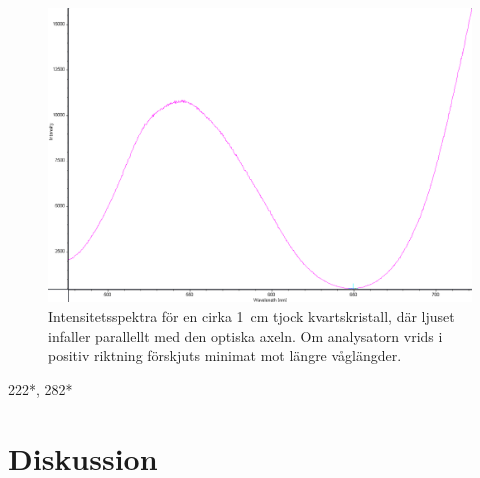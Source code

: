 \documentclass[a4paper]{article}
\begin{document}
\FloatBarrier
\begin{figure}[ht!]
	\centering
	\includegraphics[width=\linewidth]{data/spektra_aktiv2_inv}
	\caption{Intensitetsspektra för en cirka \SI{1}{\centi\m} tjock kvartskristall, där ljuset infaller parallellt med den optiska axeln. Om analysatorn vrids i positiv riktning förskjuts minimat mot längre våglängder.}
	\label{fig:}
\end{figure}
\FloatBarrier

222*, 282*

\section{Diskussion}






 
 {}
 
\end{document}
